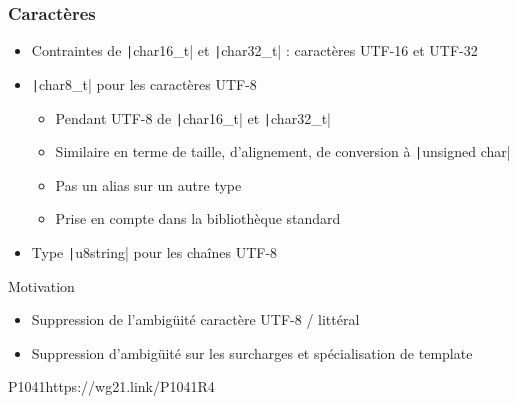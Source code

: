 \documentclass[C++.tex]{subfiles}
\begin{document}
\begin{frame}[fragile]
	\frametitle{Caractères}
	\begin{itemize}
		\item Contraintes de \texttt|char16_t| et \texttt|char32_t| : caractères UTF-16 et UTF-32


		\item \texttt|char8_t| pour les caractères UTF-8
		\begin{itemize}
			\item Pendant UTF-8 de \texttt|char16_t| et \texttt|char32_t|
			\item Similaire en terme de taille, d'alignement, de conversion à \texttt|unsigned char|
			\item Pas un alias sur un autre type
			\item Prise en compte dans la bibliothèque standard
		\end{itemize}
		\item Type \texttt|u8string| pour les chaînes UTF-8
	\end{itemize}

	\begin{block}{Motivation}
		\begin{itemize}
			\item Suppression de l'ambigüité caractère UTF-8 / littéral


			\item Suppression d'ambigüité sur les surcharges et spécialisation de template
		\end{itemize}
	\end{block}

		{P1041}{https://wg21.link/P1041R4}
\end{frame}
\end{document}
